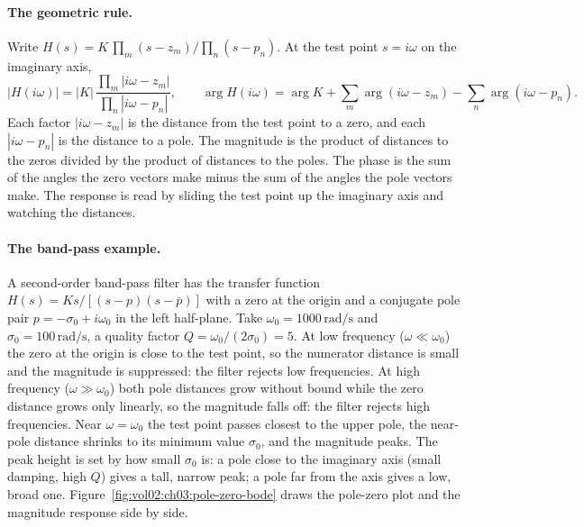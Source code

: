 \paragraph{The geometric rule.} Write $H(s) = K\,\prod_{m}(s - z_{m}) /
\prod_{n}(s - p_{n})$. At the test point $s = i\omega$ on the imaginary
axis,
\[
|H(i\omega)| = |K|\,\frac{\prod_{m}|i\omega - z_{m}|}{\prod_{n}|i\omega - p_{n}|},
\qquad
\arg H(i\omega) = \arg K + \sum_{m}\arg(i\omega - z_{m})
- \sum_{n}\arg(i\omega - p_{n}).
\]
Each factor $|i\omega - z_{m}|$ is the distance from the test point to a
zero, and each $|i\omega - p_{n}|$ is the distance to a pole. The
magnitude is the product of distances to the zeros divided by the product
of distances to the poles. The phase is the sum of the angles the zero
vectors make minus the sum of the angles the pole vectors make. The
response is read by sliding the test point up the imaginary axis and
watching the distances.

\paragraph{The band-pass example.} A second-order band-pass filter has
the transfer function $H(s) = K s / [(s - p)(s - \bar p)]$ with a zero at
the origin and a conjugate pole pair $p = -\sigma_{0} + i\omega_{0}$ in
the left half-plane. Take $\omega_{0} = 1000\,\si{\radian\per\second}$ and
$\sigma_{0} = 100\,\si{\radian\per\second}$, a quality factor $Q =
\omega_{0}/(2\sigma_{0}) = 5$. At low frequency ($\omega \ll \omega_{0}$)
the zero at the origin is close to the test point, so the numerator
distance is small and the magnitude is suppressed: the filter rejects low
frequencies. At high frequency ($\omega \gg \omega_{0}$) both pole
distances grow without bound while the zero distance grows only linearly,
so the magnitude falls off: the filter rejects high frequencies. Near
$\omega = \omega_{0}$ the test point passes closest to the upper pole, the
near-pole distance shrinks to its minimum value $\sigma_{0}$, and the
magnitude peaks. The peak height is set by how small $\sigma_{0}$ is: a
pole close to the imaginary axis (small damping, high $Q$) gives a tall,
narrow peak; a pole far from the axis gives a low, broad one.
Figure~\ref{fig:vol02:ch03:pole-zero-bode} draws the pole-zero plot and
the magnitude response side by side.

